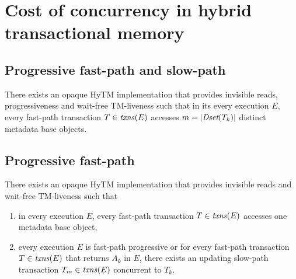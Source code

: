 \section{Cost of concurrency in hybrid transactional memory}
%
\subsection{Progressive fast-path and slow-path}
%

%
\begin{theorem}
\label{th:inswrite}
There exists an opaque HyTM implementation that provides invisible reads, progressiveness
and wait-free TM-liveness such that
in its every execution $E$, every fast-path transaction $T\in \ms{txns}(E)$
accesses $m=|\textit{Dset}(T_k)|$ distinct metadata base objects.
\end{theorem}
%
\subsection{Progressive fast-path}
%
\begin{theorem}
\label{th:inswrite2}
There exists an opaque HyTM implementation that provides invisible reads
and wait-free TM-liveness such that 
\begin{enumerate}
 \item 
in every execution $E$,
every fast-path transaction $T\in \ms{txns}(E)$
accesses one metadata base object,
\item
every execution $E$ is fast-path progressive or for
every fast-path transaction $T\in \ms{txns}(E)$
that returns $A_k$ in $E$, there exists an updating slow-path transaction $T_m \in \ms{txns}(E)$
concurrent to $T_k$.
\end{enumerate}
\end{theorem}


%
%
